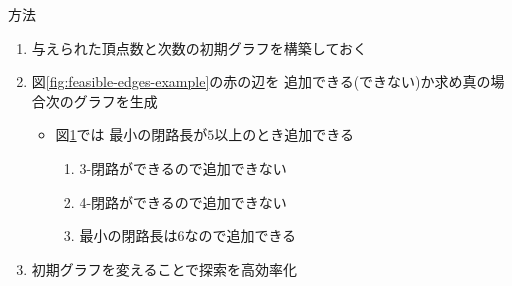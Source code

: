 \documentclass[dvipdfmx]{beamer}
\theoremstyle{definition}
\begin{document}
\begin{frame}{方法}
  \begin{enumerate}
  \item 与えられた頂点数と次数の初期グラフを構築しておく
  \item 図\ref{fig:feasible-edges-example}の赤の辺を
    追加できる(できない)か求め真の場合次のグラフを生成
    \begin{itemize}
    \item 図\ref{fig:feasible-edges-example2}では
      最小の閉路長が$5$以上のとき追加できる
      \begin{enumerate}[a]
      \item 3-閉路ができるので追加できない
      \item 4-閉路ができるので追加できない
      \item 最小の閉路長は6なので追加できる
      \end{enumerate}
    \end{itemize}
    \item 初期グラフを変えることで探索を高効率化
  \end{enumerate}
  \begin{figure}
    \centering
    \begin{minipage}{.4\columnwidth}
      \def\svgwidth{\textwidth}
      
      \label{fig:feasible-edges-example}
    \end{minipage}
    \hspace{1em}
    \begin{minipage}{.4\columnwidth}
      \def\svgwidth{\textwidth}
      
      \label{fig:feasible-edges-example2}
    \end{minipage}
  \end{figure}
\end{frame}
\end{document}

